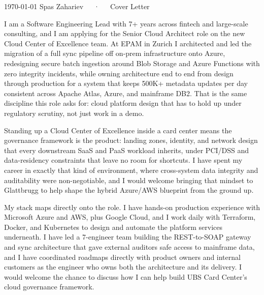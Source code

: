 \documentclass[11pt, a4paper]{awesome-cv}
\begin{document}
\makecvheader[R]

\makecvfooter
  {\today}
  {Spas Zahariev~~~·~~~Cover Letter}
  {}

\makelettertitle

\begin{cvletter}

I am a Software Engineering Lead with 7+ years across fintech and large-scale consulting, and I am applying for the Senior Cloud Architect role on the new Cloud Center of Excellence team. At EPAM in Zurich I architected and led the migration of a full sync pipeline off on-prem infrastructure onto Azure, redesigning secure batch ingestion around Blob Storage and Azure Functions with zero integrity incidents, while owning architecture end to end from design through production for a system that keeps 500K+ metadata updates per day consistent across Apache Atlas, Azure, and mainframe DB2. That is the same discipline this role asks for: cloud platform design that has to hold up under regulatory scrutiny, not just work in a demo.

Standing up a Cloud Center of Excellence inside a card center means the governance framework is the product: landing zones, identity, and network design that every downstream SaaS and PaaS workload inherits, under PCI/DSS and data-residency constraints that leave no room for shortcuts. I have spent my career in exactly that kind of environment, where cross-system data integrity and auditability were non-negotiable, and I would welcome bringing that mindset to Glattbrugg to help shape the hybrid Azure/AWS blueprint from the ground up.

My stack maps directly onto the role. I have hands-on production experience with Microsoft Azure and AWS, plus Google Cloud, and I work daily with Terraform, Docker, and Kubernetes to design and automate the platform services underneath. I have led a 7-engineer team building the REST-to-SOAP gateway and sync architecture that gave external auditors safe access to mainframe data, and I have coordinated roadmaps directly with product owners and internal customers as the engineer who owns both the architecture and its delivery. I would welcome the chance to discuss how I can help build UBS Card Center's cloud governance framework.

\end{cvletter}


\makeletterclosing
\end{document}
